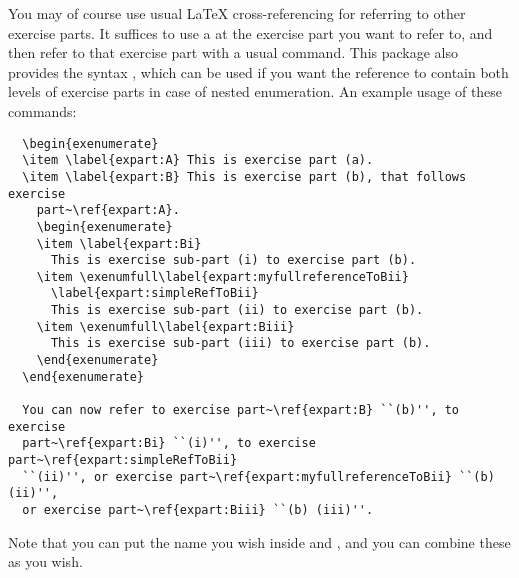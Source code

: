 \documentclass[11pt,a4paper]{article}
\begin{document}
You may of course use usual \LaTeX{} cross-referencing for referring to other exercise
parts. It suffices to use a  at the exercise part you want to refer to, and
then refer to that exercise part with a usual  command. This package also
provides the syntax , which can be used if you
want the reference to contain both levels of exercise parts in case of nested
enumeration. An example usage of these commands:
\begin{pkgverbatim}
\begin{verbatim}
  \begin{exenumerate}
  \item \label{expart:A} This is exercise part (a).
  \item \label{expart:B} This is exercise part (b), that follows exercise
    part~\ref{expart:A}.
    \begin{exenumerate}
    \item \label{expart:Bi}
      This is exercise sub-part (i) to exercise part (b).
    \item \exenumfull\label{expart:myfullreferenceToBii}
      \label{expart:simpleRefToBii}
      This is exercise sub-part (ii) to exercise part (b).
    \item \exenumfull\label{expart:Biii}
      This is exercise sub-part (iii) to exercise part (b).
    \end{exenumerate}
  \end{exenumerate}

  You can now refer to exercise part~\ref{expart:B} ``(b)'', to exercise
  part~\ref{expart:Bi} ``(i)'', to exercise part~\ref{expart:simpleRefToBii}
  ``(ii)'', or exercise part~\ref{expart:myfullreferenceToBii} ``(b) (ii)'',
  or exercise part~\ref{expart:Biii} ``(b) (iii)''.

\end{verbatim}
\end{pkgverbatim}
Note that you can put the name you wish inside  and
, and you can combine these as you wish.

\end{document}
